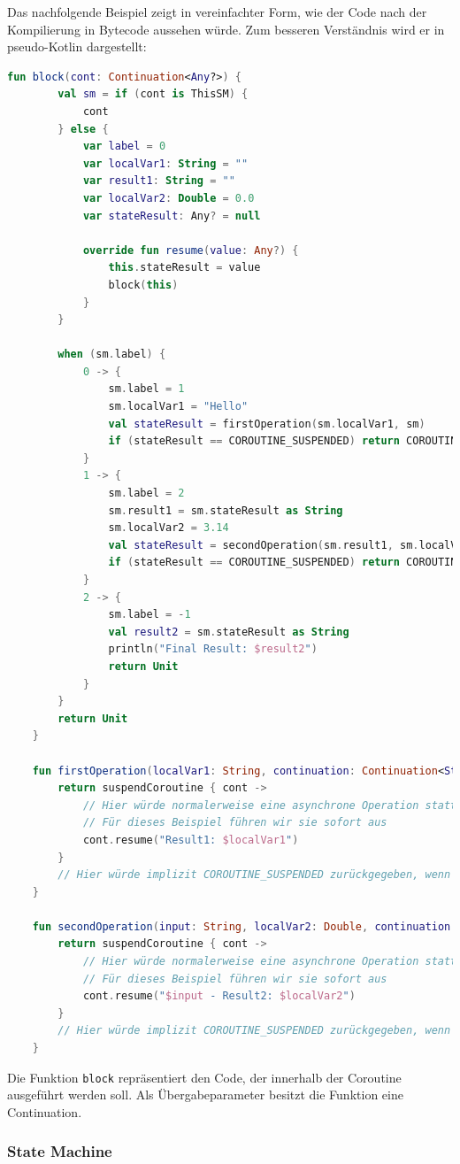 \documentclass[fontsize=12pt,paper=a4,twoside=semi,parskip=half-,headsepline,headinclude]{scrreprt}
\begin{document}
Das nachfolgende Beispiel zeigt in vereinfachter Form, wie der Code nach der Kompilierung in Bytecode aussehen würde. Zum besseren Verständnis wird er in pseudo-Kotlin dargestellt:

\begin{lstlisting}[language=Kotlin]
	fun block(cont: Continuation<Any?>) {
		val sm = if (cont is ThisSM) {
			cont
		} else {
			var label = 0
			var localVar1: String = ""
			var result1: String = ""
			var localVar2: Double = 0.0
			var stateResult: Any? = null
		
			override fun resume(value: Any?) {
				this.stateResult = value
				block(this)
			}
		}
	
		when (sm.label) {
			0 -> {
				sm.label = 1
				sm.localVar1 = "Hello"
				val stateResult = firstOperation(sm.localVar1, sm)
				if (stateResult == COROUTINE_SUSPENDED) return COROUTINE_SUSPENDED
			}
			1 -> {
				sm.label = 2
				sm.result1 = sm.stateResult as String
				sm.localVar2 = 3.14
				val stateResult = secondOperation(sm.result1, sm.localVar2, sm)
				if (stateResult == COROUTINE_SUSPENDED) return COROUTINE_SUSPENDED
			}
			2 -> {
				sm.label = -1
				val result2 = sm.stateResult as String
				println("Final Result: $result2")
				return Unit
			}
		}
		return Unit
	}

	fun firstOperation(localVar1: String, continuation: Continuation<String>): Any? {
		return suspendCoroutine { cont ->
			// Hier würde normalerweise eine asynchrone Operation stattfinden
			// Für dieses Beispiel führen wir sie sofort aus
			cont.resume("Result1: $localVar1")
		}
		// Hier würde implizit COROUTINE_SUSPENDED zurückgegeben, wenn die Coroutine blockieren würde
	}

	fun secondOperation(input: String, localVar2: Double, continuation: Continuation<String>): Any? {
		return suspendCoroutine { cont ->
			// Hier würde normalerweise eine asynchrone Operation stattfinden
			// Für dieses Beispiel führen wir sie sofort aus
			cont.resume("$input - Result2: $localVar2")
		}
		// Hier würde implizit COROUTINE_SUSPENDED zurückgegeben, wenn die Coroutine blockieren würde
	}
\end{lstlisting}

Die Funktion \texttt{block} repräsentiert den Code, der innerhalb der Coroutine ausgeführt werden soll. Als Übergabeparameter besitzt die Funktion eine Continuation.

\subsubsection{State Machine}
\end{document}
